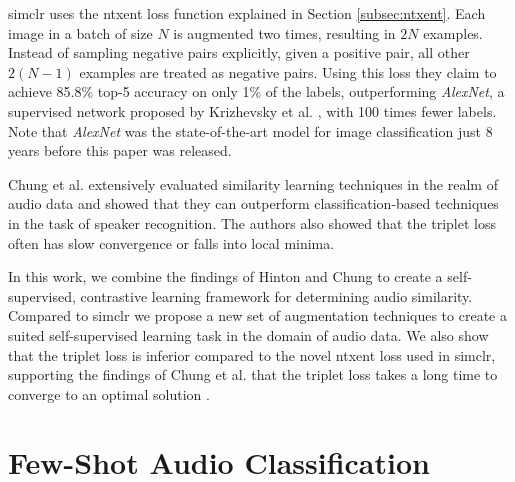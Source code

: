 \gls{simclr} uses the \gls{ntxent} loss function explained in Section \ref{subsec:ntxent}. Each image in a batch of size $N$ is augmented two times, resulting in $2N$ examples. Instead of sampling negative pairs explicitly, given a positive pair, all other $2(N-1)$ examples are treated as negative pairs. Using this loss they claim to achieve 85.8\% top-5 accuracy on only 1\% of the labels, outperforming \textit{AlexNet}, a supervised network proposed by Krizhevsky et al. \cite{NIPS2012_4824}, with 100 times fewer labels. Note that \textit{AlexNet} was the state-of-the-art model for image classification just 8 years before this paper was released.

Chung et al. \cite{chung2020defence} extensively evaluated similarity learning techniques in the realm of audio data and showed that they can outperform classification-based techniques in the task of speaker recognition. The authors also showed that the triplet loss often has slow convergence or falls into local minima.

In this work, we combine the findings of Hinton and Chung to create a self-supervised, contrastive learning framework for determining audio similarity. Compared to \gls{simclr} we propose a new set of augmentation techniques to create a suited self-supervised learning task in the domain of audio data. We also show that the triplet loss is inferior compared to the novel \gls{ntxent} loss used in \gls{simclr}, supporting the findings of Chung et al. that the triplet loss takes a long time to converge to an optimal solution \cite{chung2020defence}.

\section{Few-Shot Audio Classification}

